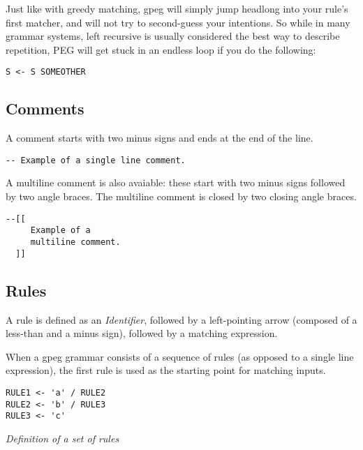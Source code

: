Just like with greedy matching, gpeg will simply jump headlong
into your rule's first matcher, and will not try to second-guess your
intentions. So while in many grammar systems, left recursive is
usually considered the best way to describe
repetition, PEG will get stuck in an endless loop if you do the following:

\begin{myquote}
\begin{verbatim}
S <- S SOMEOTHER
\end{verbatim}
\end{myquote}

\subsection{Comments}

A comment starts with two minus signs and ends at the end of the line.

\begin{myquote}
\begin{verbatim}
-- Example of a single line comment.
\end{verbatim}
\end{myquote}

A multiline comment is also avaiable: these start with two minus signs
followed by two angle braces. The multiline comment is closed by two
closing angle braces.

\begin{myquote}
\begin{verbatim}
--[[
     Example of a
     multiline comment.
  ]]
\end{verbatim}
\end{myquote}

\subsection{Rules}

A rule is defined as an \textit{Identifier}, followed by a
left-pointing arrow (composed of a less-than and a minus sign),
followed by a matching expression.

When a gpeg grammar consists of a sequence of rules
(as opposed to a single line expression),
the first rule is used as the starting point for matching inputs.

\begin{myquote}
\begin{verbatim}
RULE1 <- 'a' / RULE2
RULE2 <- 'b' / RULE3
RULE3 <- 'c'
\end{verbatim}
\end{myquote}
\textit{Definition of a set of rules}

